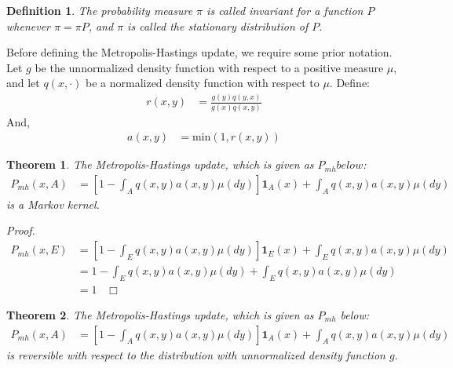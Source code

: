 \documentclass[10pt]{article}
\newtheorem{definition}{Definition}
\newtheorem{theorem}{Theorem}
\begin{document}
\begin{definition}
    The probability measure $\pi$ is called invariant for a function $P$ whenever $\pi = \pi P$, and $\pi$ is called the stationary distribution of $P$.
\end{definition}
\noindent
Before defining the Metropolis-Hastings update, we require some prior notation. Let $g$ be the unnormalized density function with respect to a positive measure $\mu$, and let $q \left( x, \cdot \right)$ be a normalized density function with respect to $\mu$. Define:
\begin{align*}
    r \left( x, y \right) &= \frac{g \left( y \right) q \left( y, x \right)}{g \left( x \right) q \left( x, y \right)}
\end{align*}
And,
\begin{align*}
    a \left( x, y \right) &= \text{min} \left( 1, r \left( x, y \right) \right)
\end{align*}

\begin{theorem}
    The Metropolis-Hastings update, which is given as $P_{mh} below$:
    \begin{align*}
        P_{mh} \left( x,A \right) &= \left[ 1 - \int _{A} q \left( x, y \right) a \left( x, y \right) \mu \left( dy \right) \right] \mathbf{1}_{A} \left( x \right) + \int _{A} q \left( x, y \right) a \left( x, y \right) \mu \left( dy \right)
    \end{align*}
    is a Markov kernel.
\end{theorem}
\noindent
\textit{Proof.} 
\begin{align*}
    P_{mh} \left( x,E \right) &= \left[ 1 - \int _{E} q \left( x, y \right) a \left( x, y \right) \mu \left( dy \right) \right] \mathbf{1}_{E} \left( x \right) + \int _{E} q \left( x, y \right) a \left( x, y \right) \mu \left( dy \right) \\[1em]
    &= 1 - \int _{E} q \left( x, y \right) a \left( x, y \right) \mu \left( dy \right) + \int _{E} q \left( x, y \right) a \left( x, y \right) \mu \left( dy \right) \\[1em]
    &= 1 \; \; \; \Box
\end{align*}

\begin{theorem}
    The Metropolis-Hastings update, which is given as $P_{mh}$ below:
    \begin{align*}
        P_{mh} \left( x,A \right) &= \left[ 1 - \int _{A} q \left( x, y \right) a \left( x, y \right) \mu \left( dy \right) \right] \mathbf{1}_{A} \left( x \right) + \int _{A} q \left( x, y \right) a \left( x, y \right) \mu \left( dy \right)
    \end{align*}
    is reversible with respect to the distribution with unnormalized density function $g$.
\end{theorem}
\end{document}

